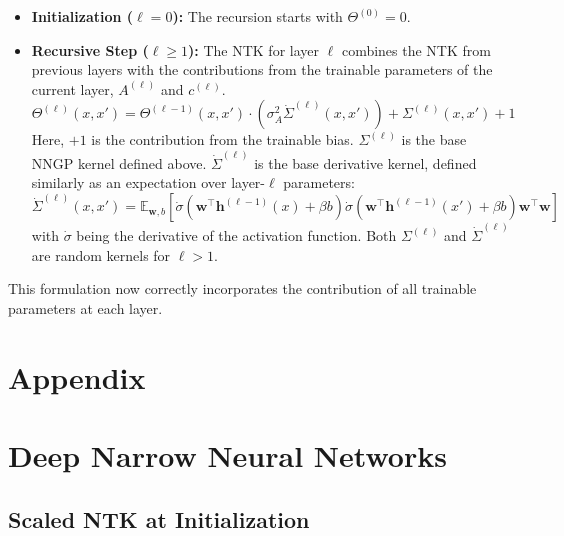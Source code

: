 \documentclass[a4paper]{article}
\begin{document}
\begin{itemize}
    \item \textbf{Initialization (\(\ell=0\)):} The recursion starts with $\Theta^{(0)} = 0$.
    
    \item \textbf{Recursive Step (\(\ell \ge 1\)):} The NTK for layer $\ell$ combines the NTK from previous layers with the contributions from the trainable parameters of the current layer, $A^{(\ell)}$ and $c^{(\ell)}$.
    \begin{equation}
        \boxed{
        \Theta^{(\ell)}(x, x') = \Theta^{(\ell-1)}(x, x') \cdot \left(\sigma_A^2\dot{\Sigma}^{(\ell)}(x, x')\right) + \Sigma^{(\ell)}(x, x') +1
        }
    \end{equation}
    Here, $+1$ is the contribution from the trainable bias. $\Sigma^{(\ell)}$ is the base NNGP kernel defined above. $\dot{\Sigma}^{(\ell)}$ is the base derivative kernel, defined similarly as an expectation over layer-$\ell$ parameters:
    \begin{equation}
        \dot{\Sigma}^{(\ell)}(x, x') = \mathbb{E}_{\bm{w}, b} \left[ \dot{\sigma}\left(\bm{w}^\top \bm{h}^{(\ell-1)}(x) + \beta b\right) \dot{\sigma}\left(\bm{w}^\top \bm{h}^{(\ell-1)}(x') + \beta b\right) \bm{w}^\top\bm{w} \right]
    \end{equation}
    with $\dot{\sigma}$ being the derivative of the activation function. Both $\Sigma^{(\ell)}$ and $\dot{\Sigma}^{(\ell)}$ are random kernels for $\ell > 1$.
\end{itemize}
This formulation now correctly incorporates the contribution of all trainable parameters at each layer.



\newpage

\appendix
\section{Appendix}








\section{Deep Narrow Neural Networks}

\subsection{Scaled NTK at Initialization}
\end{document}
